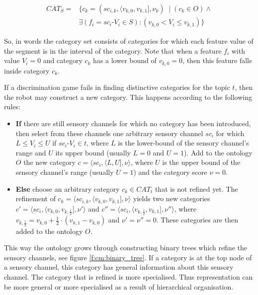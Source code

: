 \begin{eqnarray}
CAT_S=&\{c_k=(sc_{i,k},\langle v_{k,0},v_{k,1}],\nu_k)\; \mid (c_k \in O) \wedge\\
& \exists (f_i=sc_i\mbox{-}V_i \in S): (v_{k,0} < V_i \leq v_{k,1})\} \nonumber
\end{eqnarray}

\p
So, in words the category set consists of categories for which each feature value of the segment is in the interval of the category. Note that when a feature $f_i$ with value $V_i=0$ and category $c_k$ has a lower bound of $v_{k,0}=0$, then this feature falls inside category $c_k$.

If a discrimination game fails in finding distinctive categories for the topic $t$, then the robot may construct a new category. This happens according to the following rules:

\begin{itemize}
\item {\bf If} there are still sensory channels for which no category has been introduced, then select from these channels one arbitrary sensory channel $sc_i$ for which $L \leq V_i \leq U$ if $sc_i$-$V_i \in t$, where $L$ is the lower-bound of the sensory channel's range and $U$ its upper bound (usually $L=0$ and $U=1$). Add to the ontology $O$ the new category $c=\langle sc_i,\langle L,U],\nu \rangle$, where $U$ is the upper bound of the sensory channel's range (usually $U=1$) and the category score $\nu=0$.
\item {\bf Else} choose an arbitrary category $c_k \in CAT_t$ that is not refined yet. The refinement of $c_k=\langle sc_{i,k},\langle v_{k,0},v_{k,1}],\nu \rangle$ yields two new categories $c'=\langle sc_i,\langle v_{k,0},v_{k,\frac{1}{2}}],\nu'\rangle$ and $c''=\langle sc_i,\langle v_{k,\frac{1}{2}},v_{k,1}],\nu''\rangle$, where $v_{k,\frac{1}{2}}=v_{k,0}+\frac{1}{2}\cdot(v_{k,1}-v_{k,0})$ and $\nu'=\nu''=0$. These categories are then added to the ontology $O$.
\end{itemize}

This way the ontology grows through constructing binary trees which refine the sensory channels, see figure \ref{f:cm:binary_tree}. If a category is at the top node of a sensory channel, this category has general information about this sensory channel. The category that is refined is more specialised. Thus representation can be more general or more specialised as a result of hierarchical organisation.


